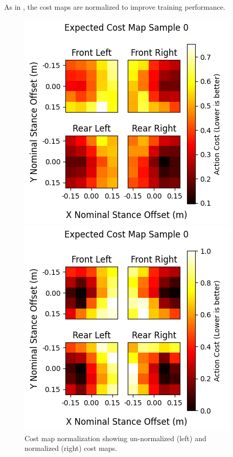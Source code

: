 As in \cite{bratta_contactnet_2024}, the cost maps are normalized
to improve training performance.

\begin{figure}
  \centering
  \begin{minipage}[T]{0.45\textwidth}
    \centering
    \includegraphics[width=\textwidth]{images/data/cost-map-normalization/un-normalized.png}
  \end{minipage}
  \hfill
  \begin{minipage}[T]{0.45\textwidth}
    \centering
    \includegraphics[width=\textwidth]{images/data/cost-map-normalization/normalized.png}
  \end{minipage}
  \hfill

  \caption{Cost map normalization showing un-normalized (left) and
  normalized (right) cost maps.}
  \label{fig:data-cost-map-normalization}
\end{figure}
